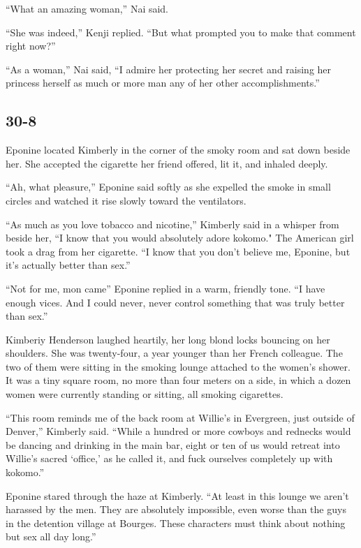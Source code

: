 \documentclass[]{article}
\begin{document}
{“What an amazing woman,” Nai said.

“She was indeed,” Kenji replied.  “But what prompted you to make that comment right now?”

“As a woman,” Nai said, “I admire her protecting her secret and raising her princess herself as much or more man any of her other accomplishments.”


\subsection*{30-8}

Eponine located Kimberly in the corner of the smoky room and sat down beside her.  She accepted the cigarette her friend offered, lit it, and inhaled deeply.

“Ah, what pleasure,” Eponine said softly as she expelled the smoke in small circles and watched it rise slowly toward the ventilators.

“As much as you love tobacco and nicotine,” Kimberly said in a whisper from beside her, “I know that you would absolutely adore kokomo."  The American girl took a drag from her cigarette.  “I know that you don’t believe me, Eponine, but it’s actually better than sex.”

“Not for me, mon came” Eponine replied in a warm, friendly tone.  “I have enough vices.  And I could never, never control something that was truly better than sex.”

Kimberiy Henderson laughed heartily, her long blond locks bouncing on her shoulders.  She was twenty-four, a year younger than her French colleague.  The two of them were sitting in the smoking lounge attached to the women’s shower.  It was a tiny square room, no more than four meters on a side, in which a dozen women were currently standing or sitting, all smoking cigarettes.

“This room reminds me of the back room at Willie’s in Evergreen, just outside of Denver,” Kimberly said.  “While a hundred or more cowboys and rednecks would be dancing and drinking in the main bar, eight or ten of us would retreat into Willie’s sacred ‘office,’ as he called it, and fuck ourselves completely up with kokomo.”

Eponine stared through the haze at Kimberly.  “At least in this lounge we aren’t harassed by the men.  They are absolutely impossible, even worse than the guys in the detention village at Bourges.  These characters must think about nothing but sex all day long.”

}
\end{document}
